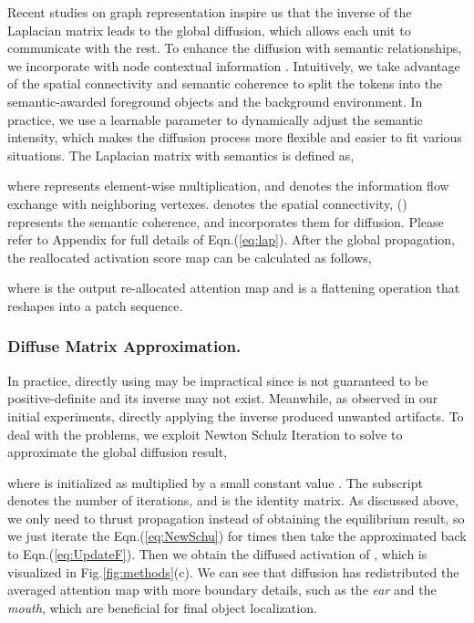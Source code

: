 \documentclass[runningheads]{llncs}
\begin{document}
Recent studies \cite{DBLP:journals/corr/LiuLLLT16,DBLP:journals/corr/LiuLLLT15,6165311} on graph representation inspire us that the inverse of the Laplacian matrix leads to the global diffusion, which allows each unit to communicate with the rest. To enhance the diffusion with semantic relationships, we incorporate  with node contextual information . Intuitively, we take advantage of the spatial connectivity and semantic coherence to split the tokens into the semantic-awarded foreground objects and the background environment. In practice, we use a learnable parameter  to dynamically adjust the semantic intensity, which makes the diffusion process more flexible and easier to fit various situations. 
The Laplacian matrix  with semantics is defined as,

where  represents element-wise multiplication, and  denotes the information flow exchange with neighboring vertexes.  denotes the spatial connectivity, 
() represents the semantic coherence, and  incorporates them for diffusion.
Please refer to Appendix for full details of Eqn.(\ref{eq:lap}).
After the global propagation, the reallocated activation score map can be calculated as follows,

where  is the output re-allocated attention map and  is a flattening operation that reshapes  into a patch sequence.






 
 




\subsubsection{Diffuse Matrix Approximation.} In practice, directly using  may be impractical since  is not guaranteed to be positive-definite and its inverse may not exist. Meanwhile, as observed in our initial experiments, directly applying the inverse produced unwanted artifacts. To deal with the problems, we exploit Newton Schulz Iteration \cite{10.1145/22145.22161,10.1007/3-540-16042-6_29} to solve  to approximate the global diffusion result,

where  is initialized as  multiplied by a small constant value . The subscript  denotes the number of iterations, and  is the identity matrix.
As discussed above, we only need  to thrust propagation instead of obtaining the equilibrium result, so we just iterate the Eqn.(\ref{eq:NewSchu}) for  times then take the approximated  back to Eqn.(\ref{eq:UpdateF}). Then we obtain the diffused activation of , which is visualized in Fig.\ref{fig:methods}(c). 
We can see that diffusion has redistributed the averaged attention map with more boundary details, such as the \textit{ear} and the \textit{mouth}, which are beneficial for final object localization.
\end{document}
